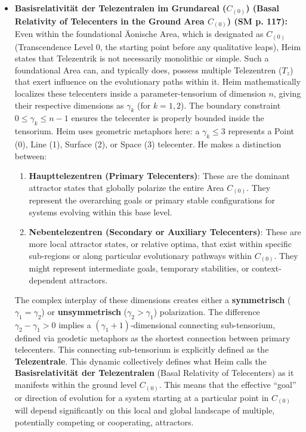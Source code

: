 \documentclass[12pt]{article}
\newcommand{\q}[1]{\enquote{#1}}
\newcommand{\telezentrum}{T_z}
\begin{document}
\begin{itemize}
    \item \textbf{Basisrelativität der Telezentralen im Grundareal (\( C_{(0)} \)) (Basal Relativity of Telecenters in the Ground Area \( C_{(0)} \)) (SM p. 117):}
    Even within the foundational Äonische Area, which is designated as \( C_{(0)} \) (Transcendence Level 0, the starting point before any qualitative leaps), Heim states that Telezentrik is not necessarily monolithic or simple. Such a foundational Area can, and typically does, possess multiple Telezentren (\(\telezentrum\)) that exert influence on the evolutionary paths within it. Heim mathematically localizes these telecenters inside a parameter-tensorium of dimension \(n\), giving their respective dimensions as \(\gamma_k\) (for \(k=1, 2\)). The boundary constraint \(0 \le \gamma_k \le n-1\) ensures the telecenter is properly bounded inside the tensorium. Heim uses geometric metaphors here: a \(\gamma_k \le 3\) represents a Point (0), Line (1), Surface (2), or Space (3) telecenter. He makes a distinction between:
    \begin{enumerate}
        \item \textbf{Haupttelezentren (Primary Telecenters)}: These are the dominant attractor states that globally polarize the entire Area \( C_{(0)} \). They represent the overarching goals or primary stable configurations for systems evolving within this base level.
        \item \textbf{Nebentelezentren (Secondary or Auxiliary Telecenters)}: These are more local attractor states, or relative optima, that exist within specific sub-regions or along particular evolutionary pathways within \( C_{(0)} \). They might represent intermediate goals, temporary stabilities, or context-dependent attractors.
    \end{enumerate}
    The complex interplay of these dimensions creates either a \textbf{symmetrisch} (\(\gamma_1 = \gamma_2\)) or \textbf{unsymmetrisch} (\(\gamma_2 > \gamma_1\)) polarization. The difference \(\gamma_2 - \gamma_1 > 0\) implies a \((\gamma_1 + 1)\)-dimensional connecting sub-tensorium, defined via geodetic metaphors as the shortest connection between primary telecenters. This connecting sub-tensorium is explicitly defined as the \textbf{Telezentrale}. This dynamic collectively defines what Heim calls the \textbf{Basisrelativität der Telezentralen} (Basal Relativity of Telecenters) as it manifests within the ground level \( C_{(0)} \). This means that the effective \q{goal} or direction of evolution for a system starting at a particular point in \( C_{(0)} \) will depend significantly on this local and global landscape of multiple, potentially competing or cooperating, attractors.


\end{itemize}
\end{document}
